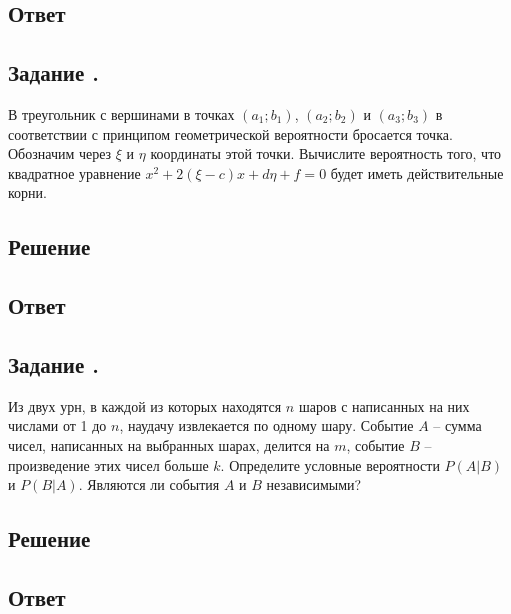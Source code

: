 \documentclass[12pt]{article}
\begin{document}
\subsection*{Ответ}

\subsection{Задание .}
В треугольник с вершинами в точках $(a_1;b_1)$, $(a_2;b_2)$ и $(a_3; b_3)$ в соответствии с принципом геометрической вероятности бросается точка.
Обозначим через $\xi$ и $\eta$ координаты этой точки.
Вычислите вероятность того, что квадратное уравнение $x^2 + 2(\xi - c)x + d\eta + f = 0$ будет иметь действительные корни.

\subsection*{Решение}
\subsection*{Ответ}

\subsection{Задание .}
Из двух урн, в каждой из которых находятся $n$ шаров с написанных на них числами от 1 до $n$, наудачу извлекается по одному шару.
Событие $A$ -- сумма чисел, написанных на выбранных шарах, делится на $m$, событие $B$ -- произведение этих чисел больше $k$.
Определите условные вероятности $P(A|B)$ и $P(B|A)$. Являются ли события $A$ и $B$ независимыми?
\subsection*{Решение}
\subsection*{Ответ}
\end{document}
